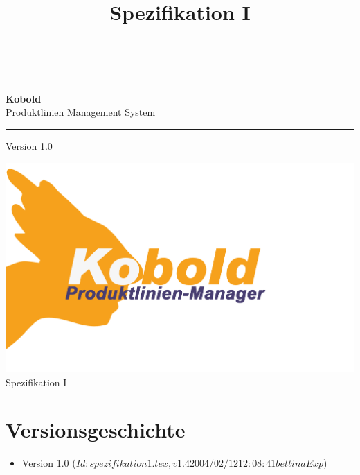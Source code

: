 \documentclass[a4paper,titlepage,12pt,ngerman]{scrbook}
\title {\huge \product\\[0.5cm]\large Spezifikation I \\[0.5cm] \version
  \\[1cm] \Large \company}
\newcommand\version{Version 1.0\xspace}
\begin{document}

\begin{titlepage}
\renewcommand{\thefootnote}{\fnsymbol{footnote}}
{\Huge
\raggedright
\textbf{\bf Kobold} \\
\huge Produktlinien Management System
\rule{\textwidth}{0.75pt}
\par
}
\begin{flushleft}
\normalsize
\version
\end{flushleft}

\vspace*{3cm}
\begin{center}

\end{center}
\vfill
\includegraphics[width=15cm]{../common/logo-color.png}
{\parindent=0cm
\Huge Spezifikation I
}


\setcounter{footnote}{0}
\end{titlepage}


\section*{Versionsgeschichte}

\begin{itemize}

\item Version 1.0  ($Id: spezifikation1.tex,v 1.4 2004/02/12 12:08:41 bettina Exp $)


\end{itemize}


\tableofcontents









\appendix

\end{document}
